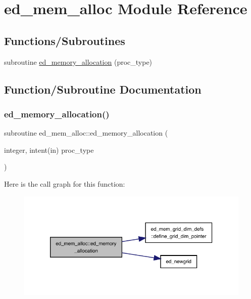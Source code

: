 \hypertarget{namespaceed__mem__alloc}{}\section{ed\+\_\+mem\+\_\+alloc Module Reference}
\label{namespaceed__mem__alloc}
\subsection*{Functions/\+Subroutines}
\begin{DoxyCompactItemize}
\item 
subroutine \hyperlink{namespaceed__mem__alloc_a410d759cf4e13ea20ace04982d91d9bb}{ed\+\_\+memory\+\_\+allocation} (proc\+\_\+type)
\end{DoxyCompactItemize}


\subsection{Function/\+Subroutine Documentation}
\mbox{\label{namespaceed__mem__alloc_a410d759cf4e13ea20ace04982d91d9bb}} 
\subsubsection{\texorpdfstring{ed\+\_\+memory\+\_\+allocation()}{ed\_memory\_allocation()}}
{\footnotesize\ttfamily subroutine ed\+\_\+mem\+\_\+alloc\+::ed\+\_\+memory\+\_\+allocation (\begin{DoxyParamCaption}\item[{integer, intent(in)}]{proc\+\_\+type }\end{DoxyParamCaption})}

Here is the call graph for this function\+:
\nopagebreak
\begin{figure}[H]
\begin{center}
\leavevmode
\includegraphics[width=326pt]{namespaceed__mem__alloc_a410d759cf4e13ea20ace04982d91d9bb_cgraph}
\end{center}
\end{figure}
